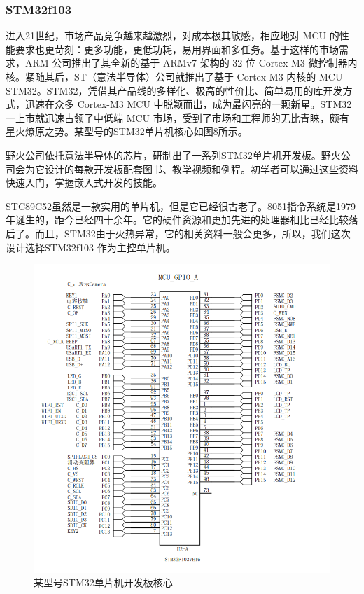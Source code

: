 \documentclass[UTF8,a4paper,11pt]{article}
\begin{document}
\subsubsection{STM32f103}
进入21世纪，市场产品竞争越来越激烈，对成本极其敏感，相应地对 MCU 的性能要求也更苛刻：更多功能，更低功耗，易用界面和多任务。基于这样的市场需求，ARM 公司推出了其全新的基于 ARMv7 架构的 32 位 Cortex-M3 微控制器内核。紧随其后，ST（意法半导体）公司就推出了基于 Cortex-M3 内核的 MCU—STM32。STM32，凭借其产品线的多样化、极高的性价比、简单易用的库开发方式，迅速在众多 Cortex-M3 MCU 中脱颖而出，成为最闪亮的一颗新星。STM32 一上市就迅速占领了中低端 MCU 市场，受到了市场和工程师的无比青睐，颇有星火燎原之势。某型号的STM32单片机核心如图8所示。

野火公司依托意法半导体的芯片，研制出了一系列STM32单片机开发板。野火公司会为它设计的每款开发板配套图书、教学视频和例程。初学者可以通过这些资料快速入门，掌握嵌入式开发的技能。

STC89C52虽然是一款实用的单片机，但是它已经很古老了。8051指令系统是1979年诞生的，距今已经四十余年。它的硬件资源和更加先进的处理器相比已经比较落后了。而且，STM32由于火热异常，它的相关资料一般会更多，所以，我们这次设计选择STM32f103 作为主控单片机。

\begin{figure}[htbp]
    \centering
    \includegraphics[scale=0.9]{p7.png}
    \caption{某型号STM32单片机开发板核心}
\end{figure} 
\end{document}

